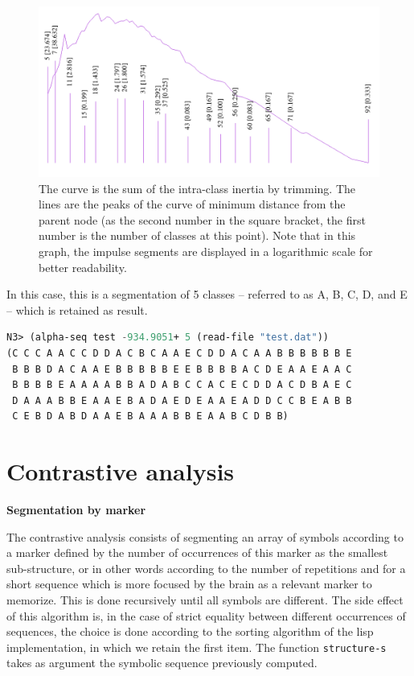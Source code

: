 \begin{figure}[!hbt]
	\begin{center}
		\includegraphics[scale=0.35]{img/4412}
		\caption{The curve is the sum of the intra-class inertia by trimming. The lines are the peaks of the curve of minimum distance from the parent node (as the second number in the square bracket, the first number is the number of classes at this point). 
		Note that in this graph, the impulse segments are displayed in a logarithmic scale for better readability.}
		\label{fig:seg}
	\end{center}
\end{figure}
	
In this case, this is a segmentation of 5 classes -- referred to as A, B, C, D, and E -- which is retained as result.

\smallskip

\begin{lstlisting}[language=Lisp]
N3> (alpha-seq test -934.9051+ 5 (read-file "test.dat"))
(C C C A A C C D D A C B C A A E C D D A C A A B B B B B B E 
 B B B D A C A A E B B B B B E E B B B B A C D E A A E A A C
 B B B B E A A A A B B A D A B C C A C E C D D A C D B A E C
 D A A A B B E A A E B A D A E D E A A E A D D C C B E A B B
 C E B D A B D A A E B A A A B B E A A B C D B B)
\end{lstlisting}

\section{Contrastive analysis}

\textbf{Segmentation by marker}
\smallskip

The contrastive analysis consists of segmenting an array of symbols according to a marker defined by the number of occurrences of this marker as the smallest sub-structure, or in other words according to the number of repetitions and for a short sequence which is more focused by the brain as a relevant marker to memorize. This is done recursively until all symbols are different. The side effect of this algorithm is, in the case of strict equality between different occurrences of sequences, the choice is done according to the sorting algorithm of the lisp implementation, in which we retain the first item. The function \texttt{structure-s} takes as argument the symbolic sequence previously computed.


